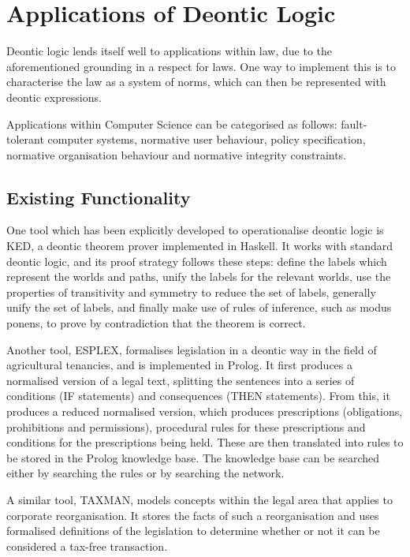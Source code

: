 \documentclass{l4proj}
\begin{document}
\section{Applications of Deontic Logic}%
Deontic logic lends itself well to applications within law, due to the aforementioned grounding in a respect for laws. One way to implement this is to characterise the law as a system of norms\cite{law-jonessergot}, which can then be represented with deontic expressions. 

Applications within Computer Science can be categorised as follows\cite{meyer93applications}: fault-tolerant computer systems, normative user behaviour, policy specification, normative organisation behaviour and normative integrity constraints. 

\subsection{Existing Functionality}%
One tool which has been explicitly developed to operationalise deontic logic is KED\cite{KED}, a deontic theorem prover implemented in Haskell. It works with standard deontic logic, and its proof strategy follows these steps: define the labels which represent the worlds and paths, unify the labels for the relevant worlds, use the properties of transitivity and symmetry to reduce the set of labels, generally unify the set of labels, and finally make use of rules of inference, such as modus ponens, to prove by contradiction that the theorem is correct. 

Another tool, ESPLEX, formalises legislation in a deontic way in the field of agricultural tenancies\cite{ESPLEX}, and is implemented in Prolog. It first produces a normalised version of a legal text, splitting the sentences into a series of conditions (IF statements) and consequences (THEN statements). From this, it produces a reduced normalised version, which produces prescriptions (obligations, prohibitions and permissions), procedural rules for these prescriptions and conditions for the prescriptions being held. These are then translated into rules to be stored in the Prolog knowledge base. The knowledge base can be searched either by searching the rules or by searching the network. 

A similar tool, TAXMAN, models concepts within the legal area that applies to corporate reorganisation\cite{TAXMAN}. It stores the facts of such a reorganisation and uses formalised definitions of the legislation to determine whether or not it can be considered a tax-free transaction. 
\end{document}
